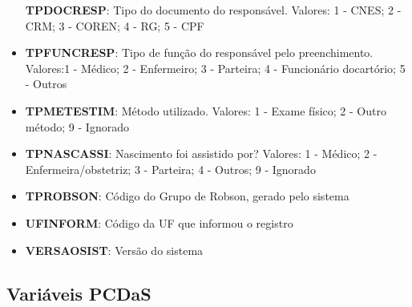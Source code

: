 \documentclass[
]{article}
\begin{document}
\begin{itemize}
  \textbf{TPDOCRESP}: Tipo do documento do responsável. Valores: 1 -
  CNES; 2 - CRM; 3 - COREN; 4 - RG; 5 - CPF
\item
  \textbf{TPFUNCRESP}: Tipo de função do responsável pelo preenchimento.
  Valores:1 - Médico; 2 - Enfermeiro; 3 - Parteira; 4 - Funcionário
  docartório; 5 - Outros
\item
  \textbf{TPMETESTIM}: Método utilizado. Valores: 1 - Exame físico; 2 -
  Outro método; 9 - Ignorado
\item
  \textbf{TPNASCASSI}: Nascimento foi assistido por? Valores: 1 -
  Médico; 2 - Enfermeira/obstetriz; 3 - Parteira; 4 - Outros; 9 -
  Ignorado
\item
  \textbf{TPROBSON}: Código do Grupo de Robson, gerado pelo sistema
\item
  \textbf{UFINFORM}: Código da UF que informou o registro
\item
  \textbf{VERSAOSIST}: Versão do sistema
\end{itemize}

\hypertarget{variuxe1veis-pcdas}{%
\subsection{Variáveis PCDaS}\label{variuxe1veis-pcdas}}
\end{document}
